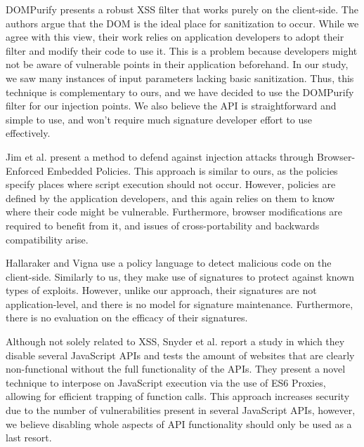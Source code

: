 DOMPurify  \cite{10.1007/978-3-319-66399-9_7} presents a robust XSS filter that works purely on the client-side. The authors argue that the DOM is the ideal place for sanitization to occur. While we agree with this view, their work relies on application developers to adopt their filter and modify their code to use it. This is a problem because developers might not be aware of vulnerable points in their application beforehand. In our study, we saw many instances of input parameters lacking basic sanitization. Thus, this technique is complementary to ours, and we have decided to use the DOMPurify filter for our injection points. We also believe the API is straightforward and simple to use, and won't require much signature developer effort to use effectively.

Jim et al. \cite{Jim:2007:DSI:1242572.1242654} present a method to defend against injection attacks through Browser-Enforced Embedded Policies. This approach is similar to ours, as the policies specify places where script execution should not occur. However, policies are defined by the application developers, and this again relies on them to know where their code might be vulnerable. Furthermore, browser modifications are required to benefit from it, and issues of cross-portability and backwards compatibility arise.

Hallaraker and Vigna \cite{Hallaraker:2005:DMJ:1078029.1078861} use a policy language to detect malicious code on the client-side. Similarly to us, they make use of signatures to protect against known types of exploits. However, unlike our approach, their signatures are not application-level, and there is no model for signature maintenance. Furthermore, there is no evaluation on the efficacy of their signatures. 

Although not solely related to XSS, Snyder et al. \cite{Snyder:2017:MWD:3133956.3133966} report a study in which they disable several JavaScript APIs and tests the amount of websites that are clearly non-functional without the full functionality of the APIs. They present a novel technique to interpose on JavaScript execution via the use of ES6 Proxies, allowing for efficient trapping of function calls. This approach increases security due to the number of vulnerabilities present in several JavaScript APIs, however, we believe disabling whole aspects of API functionality should only be used as a last resort.

